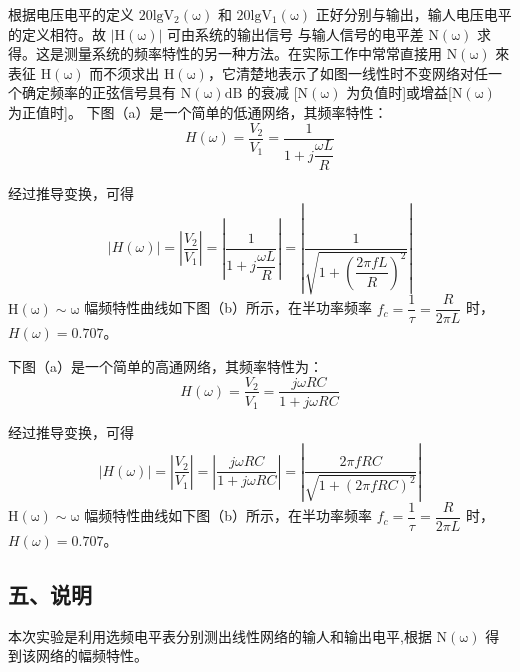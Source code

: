 \documentclass[dvipsnames, svgnames,a4paper,11pt]{article}
\begin{document}
根据电压电平的定义 $\mathrm{20lgV_2(\omega)}$ 和 $\mathrm{20lgV_1(\omega)}$ 正好分别与输出，输人电压电平的定义相符。故 $\mathrm{|H(\omega)|}$ 可由系统的输出信号 与输人信号的电平差 $\mathrm{N(\omega)}$ 求得。这是测量系统的频率特性的另一种方法。在实际工作中常常直接用 $\mathrm{N(\omega)}$ 來表征 $\mathrm{H(\omega)}$ 而不须求出 $\mathrm{H(\omega)}$，它清楚地表示了如图一线性时不变网络对任一个确定频率的正弦信号具有 $\mathrm{N(\omega)dB}$ 的衰减 [$\mathrm{N(\omega)}$ 为负值时]或增益[$\mathrm{N(\omega)}$ 为正值时]。
下图（a）是一个简单的低通网络，其频率特性：
\begin{equation}
  H(\omega) = \dfrac{V_2}{V_1} = \dfrac{1}{1 + j\dfrac{\omega L}{R}}
\end{equation}

经过推导变换，可得
\begin{equation}
  \left |H(\omega) \right | = \left |\dfrac{V_2}{V_1} \right | = \left |\dfrac{1}{1 + j\dfrac{\omega L}{R}}\right | = \left | \dfrac{1}{\sqrt{1 + (\dfrac{2\pi fL}{R})^2}} \right |
\end{equation}
$\mathrm{H(\omega) \sim \omega}$ 幅频特性曲线如下图（b）所示，在半功率频率 $f_c = \dfrac{1}{\tau} = \dfrac{R}{2\pi L}$ 时，$H(\omega) = 0.707$。

下图（a）是一个简单的高通网络，其频率特性为：
\begin{equation}
  H(\omega) = \dfrac{V_2}{V_1} = \dfrac{j\omega RC}{1 + j\omega RC}
\end{equation}

经过推导变换，可得
\begin{equation}
  \left |H(\omega) \right | = \left |\dfrac{V_2}{V_1} \right | = \left |\dfrac{j\omega RC}{1 + j\omega RC}\right | = \left | \dfrac{2\pi fRC}{\sqrt{1 + (2\pi fRC)^2}} \right |
\end{equation}
$\mathrm{H(\omega) \sim \omega}$ 幅频特性曲线如下图（b）所示，在半功率频率 $f_c = \dfrac{1}{\tau} = \dfrac{R}{2\pi L}$ 时，$H(\omega) = 0.707$。

\begin{figure}[htbp]
	\centering
	\caption{}
\end{figure}

\subsection*{五、说明}
本次实验是利用选频电平表分别测出线性网络的输人和输出电平,根据 $\mathrm{N(\omega)}$ 得到该网络的幅频特性。
\end{document}
